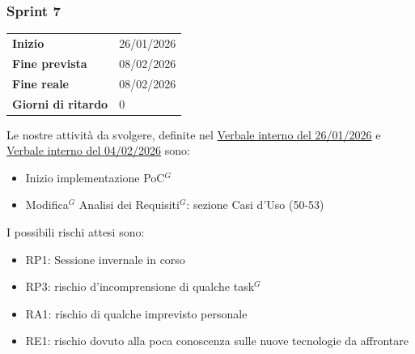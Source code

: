\subsubsection{Sprint 7}


\begin{tabular}{p{} p{}}
	\textbf{Inizio} & 26/01/2026 \\
	\textbf{Fine prevista} & 08/02/2026 \\
	\textbf{Fine reale} &  08/02/2026\\
	\textbf{Giorni di ritardo} & 0
\end{tabular}
\newline \newline 
Le nostre attività da svolgere, definite nel \href{https://nullpointersgroup.github.io/Documentazione/output/RTB/Verbali%20Interni/2026-01-26_verbale_interno.pdf}{Verbale interno del 26/01/2026} e \href{https://nullpointersgroup.github.io/Documentazione/output/RTB/Verbali%20Interni/2026-02-04_verbale_interno.pdf}{Verbale interno del 04/02/2026} sono:
\begin{itemize}[itemsep=5pt, parsep=1pt, label=$\scriptstyle\bullet$]
    \item Inizio implementazione PoC$^G$
    \item Modifica$^G$ Analisi dei Requisiti$^G$: sezione Casi d'Uso (50-53)
\end{itemize}

I possibili rischi attesi sono:
\begin{itemize}[itemsep=5pt, parsep=1pt, label=$\scriptstyle\bullet$]
	\item RP1: Sessione invernale in corso 
	\item RP3: rischio d'incomprensione di qualche task$^G$
	\item RA1: rischio di qualche imprevisto personale
	\item RE1: rischio dovuto alla poca conoscenza sulle nuove tecnologie da affrontare
\end{itemize}

